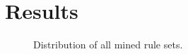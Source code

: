 \chapter{Results}
\begin{figure}
\centering
    \centering
    
    \caption{Distribution of all mined rule sets.}
    \label{all_sets}
\end{figure}